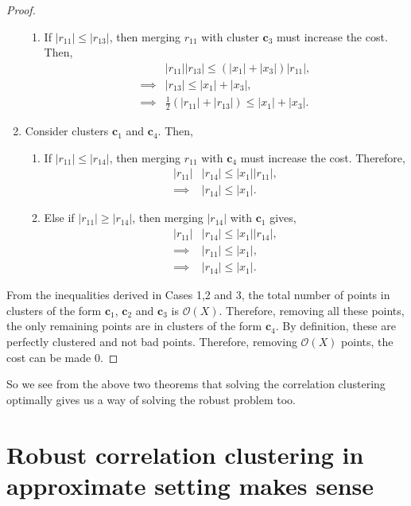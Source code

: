 \begin{proof}
\begin{enumerate}
    \begin{enumerate}
        \item If $|r_{11}| \le |r_{13}|$, then merging $r_{11}$ with cluster $\mathbf{c}_3$ must increase the cost. Then,
        \begin{align*}
            &|r_{11}| |r_{13}| \le (|x_1| + |x_3|) |r_{11}|,\\
            \implies &|r_{13}| \le |x_1| + |x_3|,\\
            \implies &\frac12 (|r_{11}|+|r_{13}|) \le |x_1| + |x_3|.
        \end{align*}
    \end{enumerate}
    \item Consider clusters $\mathbf{c}_1$ and $\mathbf{c}_4$. Then,
    \begin{enumerate}
        \item If $|r_{11}| \le |r_{14}|$, then merging $r_{11}$ with $\mathbf{c}_4$ must increase the cost. Therefore,
        \begin{align*}
            |r_{11}| &|r_{14}| \le |x_1| |r_{11}|,\\
            \implies &|r_{14}| \le |x_1|.
        \end{align*}
        \item Else if $|r_{11}| \ge |r_{14}|$, then merging $|r_{14}|$ with $\mathbf{c}_1$ gives,
        \begin{align*}
            |r_{11}| &|r_{14}| \le |x_1| |r_{14}|,\\
            \implies &|r_{11}| \le |x_1|,\\
            \implies &|r_{14}| \le |x_1|.
        \end{align*}
    \end{enumerate}
\end{enumerate}

From the inequalities derived in Cases 1,2 and 3, the total number of points in clusters of the form $\mathbf{c}_1$, $\mathbf{c}_2$ and $\mathbf{c}_3$ is $\mathcal{O} (X)$. Therefore, removing all these points, the only remaining points are in clusters of the form $\mathbf{c}_4$. By definition, these are perfectly clustered and not bad points. Therefore, removing $\mathcal{O} (X)$ points, the cost can be made $0$.
\end{proof}

So we see from the above two theorems that solving the correlation clustering optimally gives us a way of solving the robust problem too.

\section{Robust correlation clustering in approximate setting makes sense}

